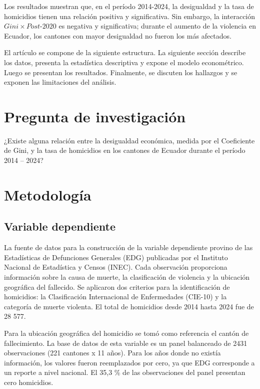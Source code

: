 \documentclass[12pt,a4paper]{article}
\begin{document}
Los resultados muestran que, en el período 2014-2024, la desigualdad y la tasa de homicidios tienen una relación positiva y significativa. Sin embargo, la interacción \(Gini \times Post\text{-}2020\) es negativa y significativa; durante el aumento de la violencia en Ecuador, los cantones con mayor desigualdad no fueron los más afectados.

El artículo se compone de la siguiente estructura. La siguiente sección describe los datos, presenta la estadística descriptiva y expone el modelo econométrico. Luego se presentan los resultados. Finalmente, se discuten los hallazgos y se exponen las limitaciones del análisis.

\section*{Pregunta de investigación}

¿Existe alguna relación entre la desigualdad económica, medida por el Coeficiente de Gini, y la tasa de homicidios en los cantones de Ecuador durante el período 2014 – 2024?

\section*{Metodología}

\subsection*{Variable dependiente}

La fuente de datos para la construcción de la variable dependiente provino de las Estadísticas de Defunciones Generales (EDG) publicadas por el Instituto Nacional de Estadística y Censos (INEC). Cada observación proporciona información sobre la causa de muerte, la clasificación de violencia y la ubicación geográfica del fallecido. Se aplicaron dos criterios para la identificación de homicidios: la Clasificación Internacional de Enfermedades (CIE-10) y la categoría de muerte violenta. El total de homicidios desde 2014 hasta 2024 fue de 28 577.

Para la ubicación geográfica del homicidio se tomó como referencia el cantón de fallecimiento. La base de datos de esta variable es un panel balanceado de 2431 observaciones (221 cantones x 11 años). Para los años donde no existía información, los valores fueron reemplazados por cero, ya que EDG corresponde a un reporte a nivel nacional. El 35,3 \% de las observaciones del panel presentan cero homicidios.
\end{document}
